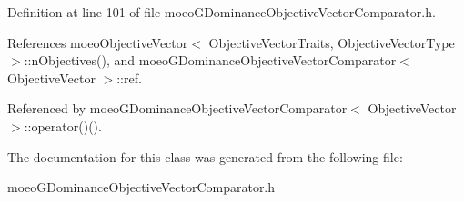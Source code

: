Definition at line 101 of file moeo\-GDominance\-Objective\-Vector\-Comparator.h.

References moeo\-Objective\-Vector$<$ Objective\-Vector\-Traits, Objective\-Vector\-Type $>$::n\-Objectives(), and moeo\-GDominance\-Objective\-Vector\-Comparator$<$ Objective\-Vector $>$::ref.

Referenced by moeo\-GDominance\-Objective\-Vector\-Comparator$<$ Objective\-Vector $>$::operator()().

The documentation for this class was generated from the following file:\begin{CompactItemize}
\item 
moeo\-GDominance\-Objective\-Vector\-Comparator.h\end{CompactItemize}
